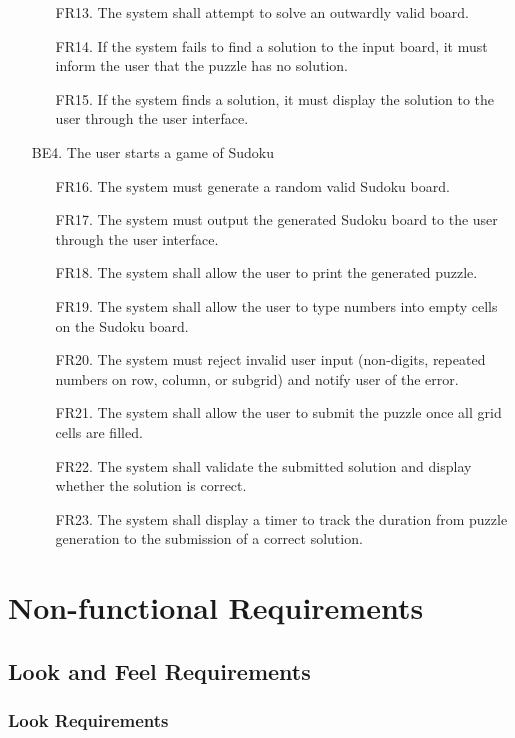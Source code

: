 \documentclass[11pt]{article}
\begin{document}
\begin{enumerate}
\begin{enumerate}
        \item [FR13.] The system shall attempt to solve an outwardly valid board.
        \item [FR14.] If the system fails to find a solution to the input board, it must inform the user that the puzzle has no solution.
        \item [FR15.] If the system finds a solution, it must display the solution to the user through the user interface.
    \end{enumerate}
    \item [BE4.] The user starts a game of Sudoku
    \begin{enumerate}
        \item [FR16.] The system must generate a random valid Sudoku board.
        \item [FR17.] The system must output the generated Sudoku board to the user through the user interface.
        \item [FR18.] The system shall allow the user to print the generated puzzle.
        \item [FR19.] The system shall allow the user to type numbers into empty cells on the Sudoku board.
        \item [FR20.] The system must reject invalid user input (non-digits, repeated numbers on row, column, or subgrid) and notify user of the error.
        \item [FR21.] The system shall allow the user to submit the puzzle once all grid cells are filled.
        \item [FR22.] The system shall validate the submitted solution and display whether the solution is correct.
        \item [FR23.] The system shall display a timer to track the duration from puzzle generation to the submission of a correct solution.
    \end{enumerate}
\end{enumerate}

\section{Non-functional Requirements}

\subsection{Look and Feel Requirements}

\subsubsection{Look Requirements}
\end{document}
